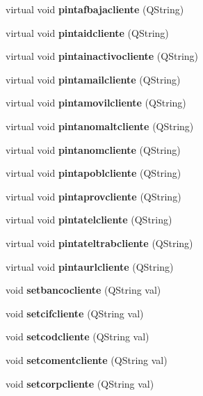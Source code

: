 \begin{CompactItemize}
\item 
virtual void {\bf pintafbajacliente} (QString)\label{classCliente_a15}

\item 
virtual void {\bf pintaidcliente} (QString)\label{classCliente_a16}

\item 
virtual void {\bf pintainactivocliente} (QString)\label{classCliente_a17}

\item 
virtual void {\bf pintamailcliente} (QString)\label{classCliente_a18}

\item 
virtual void {\bf pintamovilcliente} (QString)\label{classCliente_a19}

\item 
virtual void {\bf pintanomaltcliente} (QString)\label{classCliente_a20}

\item 
virtual void {\bf pintanomcliente} (QString)\label{classCliente_a21}

\item 
virtual void {\bf pintapoblcliente} (QString)\label{classCliente_a22}

\item 
virtual void {\bf pintaprovcliente} (QString)\label{classCliente_a23}

\item 
virtual void {\bf pintatelcliente} (QString)\label{classCliente_a24}

\item 
virtual void {\bf pintateltrabcliente} (QString)\label{classCliente_a25}

\item 
virtual void {\bf pintaurlcliente} (QString)\label{classCliente_a26}

\item 
void {\bf setbancocliente} (QString val)\label{classCliente_a27}

\item 
void {\bf setcifcliente} (QString val)\label{classCliente_a28}

\item 
void {\bf setcodcliente} (QString val)\label{classCliente_a29}

\item 
void {\bf setcomentcliente} (QString val)\label{classCliente_a30}

\item 
void {\bf setcorpcliente} (QString val)\label{classCliente_a31}


\end{CompactItemize}
